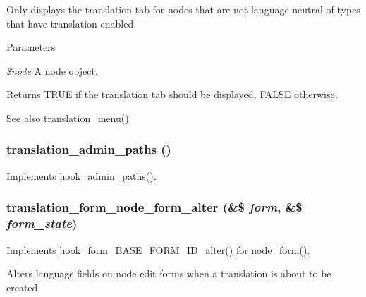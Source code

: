 Only displays the translation tab for nodes that are not language-\/neutral of types that have translation enabled.


\begin{DoxyParams}{Parameters}
\item[{\em \$node}]A node object.\end{DoxyParams}
\begin{DoxyReturn}{Returns}
TRUE if the translation tab should be displayed, FALSE otherwise.
\end{DoxyReturn}
\begin{DoxySeeAlso}{See also}
\hyperlink{translation_8module_a31c2f0307fce1bcb4da69eda5131f4c5}{translation\_\-menu()} 
\end{DoxySeeAlso}
\hypertarget{translation_8module_ad12e430e331144bbab6b70034e2f1de8}{
\subsubsection[{translation\_\-admin\_\-paths}]{\setlength{\rightskip}{0pt plus 5cm}translation\_\-admin\_\-paths ()}}
\label{translation_8module_ad12e430e331144bbab6b70034e2f1de8}
Implements \hyperlink{group__hooks_ga3fe6d93afc8bb04afbd9e3c326d1bdc1}{hook\_\-admin\_\-paths()}. \hypertarget{translation_8module_a0af45118bec0e066f3f2fb6d93e5ecfb}{
\subsubsection[{translation\_\-form\_\-node\_\-form\_\-alter}]{\setlength{\rightskip}{0pt plus 5cm}translation\_\-form\_\-node\_\-form\_\-alter (\&\$ {\em form}, \/  \&\$ {\em form\_\-state})}}
\label{translation_8module_a0af45118bec0e066f3f2fb6d93e5ecfb}
Implements \hyperlink{group__hooks_gaf0cfc224a88c8823da68856c30a4841a}{hook\_\-form\_\-BASE\_\-FORM\_\-ID\_\-alter()} for \hyperlink{group__forms_ga267299500e205db099ee4e8396769d3f}{node\_\-form()}.

Alters language fields on node edit forms when a translation is about to be created.

